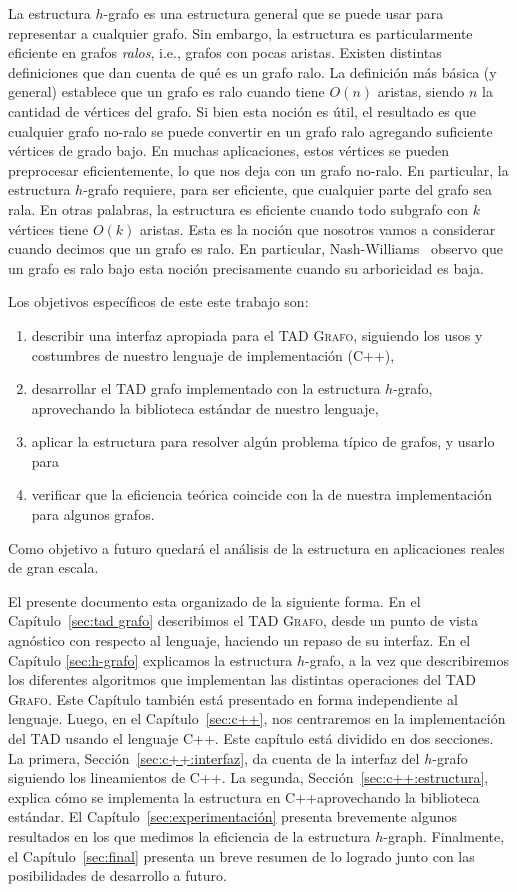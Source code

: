 \documentclass[%
    a4paper,%
    fontsize=12pt,%
    DIV=12,
    twoside,%
    openright,%
    titlepage=true,%
    headsepline,%
    toc=bibliography,%
    parskip=half,%
    cleardoublepage=empty,%
    headings=big,%
]{scrbook}
\newcommand{\Grafo}{\textsc{Grafo}\xspace}
\DeclareRobustCommand{\CPP}{C\nolinebreak[4]\hspace{-.05em}\raisebox{.4ex}{\relsize{-3}\textbf{++}}\xspace}
\def\CPP{C++}%
\begin{document}
La estructura $h$-grafo es una estructura general que se puede usar para representar a cualquier grafo.  Sin embargo, la estructura es particularmente eficiente en grafos \emph{ralos}, i.e., grafos con pocas aristas.  Existen distintas definiciones que dan cuenta de qué es un grafo ralo.  La definición más básica (y general) establece que un grafo es ralo cuando tiene $O(n)$ aristas, siendo $n$ la cantidad de vértices del grafo.  Si bien esta noción es útil, el resultado es que cualquier grafo no-ralo se puede convertir en un grafo ralo agregando suficiente vértices de grado bajo.  En muchas aplicaciones, estos vértices se pueden preprocesar eficientemente, lo que nos deja con un grafo no-ralo.  En particular, la estructura $h$-grafo requiere, para ser eficiente, que cualquier parte del grafo sea rala.  En otras palabras, la estructura es eficiente cuando todo subgrafo con $k$ vértices tiene $O(k)$ aristas.  Esta es la noción que nosotros vamos a considerar cuando decimos que un grafo es ralo.  En particular, Nash-Williams~\cite{Nash-WilliamsJLMS1964} observo que un grafo es ralo bajo esta noción precisamente cuando su arboricidad es baja.

Los objetivos específicos de este este trabajo son:
\begin{enumerate}
  \item describir una interfaz apropiada para el TAD \Grafo, siguiendo los usos y costumbres de nuestro lenguaje de implementación (\CPP),
  \item desarrollar el TAD grafo implementado con la estructura $h$-grafo, aprovechando la biblioteca estándar de nuestro lenguaje,
  \item aplicar la estructura para resolver algún problema típico de grafos, y usarlo para
  \item verificar que la eficiencia teórica coincide con la de nuestra implementación para algunos grafos.
\end{enumerate}
Como objetivo a futuro quedará el análisis de la estructura en aplicaciones reales de gran escala.

El presente documento esta organizado de la siguiente forma.  En el Capítulo~\ref{sec:tad grafo} describimos el TAD \Grafo, desde un punto de vista agnóstico con respecto al lenguaje, haciendo un repaso de su interfaz.  En el Capítulo \ref{sec:h-grafo} explicamos la estructura $h$-grafo, a la vez que describiremos los diferentes algoritmos que implementan las distintas operaciones del TAD \Grafo.  Este Capítulo también está presentado en forma independiente al lenguaje.  Luego, en el Capítulo~\ref{sec:c++}, nos centraremos en la implementación del TAD usando el lenguaje \CPP. Este capítulo está dividido en dos secciones. La primera, Sección~\ref{sec:c++:interfaz}, da cuenta de la interfaz del $h$-grafo siguiendo los lineamientos de \CPP. La segunda, Sección~\ref{sec:c++:estructura}, explica cómo se implementa la estructura en \CPP aprovechando la biblioteca estándar.  El Capítulo~\ref{sec:experimentación} presenta brevemente algunos resultados en los que medimos la eficiencia de la estructura $h$-graph.  Finalmente, el Capítulo~\ref{sec:final} presenta un breve resumen de lo logrado junto con las posibilidades de desarrollo a futuro.
\end{document}
